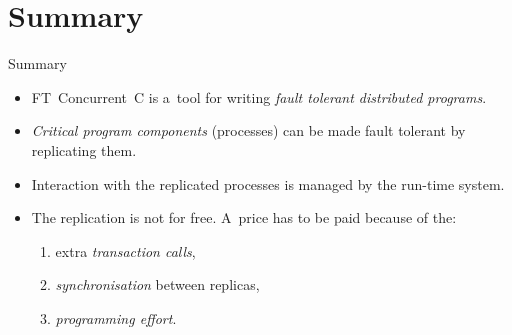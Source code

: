\documentclass[
    10pt, hyperref={unicode, colorlinks, hypertexnames=false,
    linkcolor=white}, aspectratio=169
]{beamer}
\begin{document}
\section{Summary}
\begin{frame}{Summary}
    \begin{itemize}\setlength\itemsep{2em}
        \item
            \alert{FT~Concurrent~C} is a~tool for writing \emph{fault tolerant
            distributed programs}.

        \item
            \emph{Critical program components} (processes) can be made fault
            tolerant by \alert{replicating} them.

        \item
            Interaction with the replicated processes is managed by the
            \alert{run-time system}.

        \item
            The replication is \alert{not for free}. A~price has to be paid
            because of the:

            \begin{enumerate}\setlength\itemsep{.5em}
                \item
                    extra \emph{transaction calls},

                \item
                    \emph{synchronisation} between replicas,

                \item
                    \emph{programming effort}.
            \end{enumerate}
    \end{itemize}
\end{frame}
\end{document}
